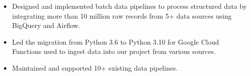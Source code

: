 \documentclass[10pt,a4paper,ragged2e]{altacv}
\begin{document}

\begin{fullwidth}
\makecvheader
\end{fullwidth}



\smallskip
{}
\begin{itemize}
\item Designed and implemented batch data pipelines to process structured data by integrating more than 10 million raw records from 5+ data sources using BigQuery and Airflow.
\item Led the migration from Python 3.6 to Python 3.10 for Google Cloud Functions used to ingest data into our project from various sources.
\item  Maintained and supported 10+ existing data pipelines.
\smallskip
\end{itemize}

\divider
\end{document}

